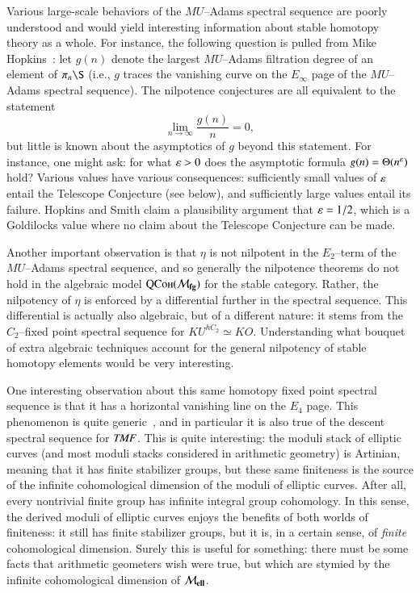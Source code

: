 Various large-scale behaviors of the $MU$--Adams spectral sequence are poorly understood and would yield interesting information about stable homotopy theory as a whole.  For instance, the following question is pulled from Mike Hopkins~\cite[Section 10]{HopkinsOnRavenel}: let $g(n)$ denote the largest $MU$--Adams filtration degree of an element of $\pi_n \S$ (i.e., $g$ traces the vanishing curve on the $E_\infty$ page of the $MU$--Adams spectral sequence).  The nilpotence conjectures are all equivalent to the statement \[\lim_{n \to \infty} \frac{g(n)}{n} = 0,\] but little is known about the asymptotics of $g$ beyond this statement.  For instance, one might ask: for what $\varepsilon > 0$ does the asymptotic formula $g(n) = \Theta(n^{\varepsilon})$ hold?  Various values have various consequences: sufficiently small values of $\varepsilon$ entail the Telescope Conjecture (see below), and sufficiently large values entail its failure.  Hopkins and Smith claim a plausibility argument that $\varepsilon = 1/2$, which is a Goldilocks value where no claim about the Telescope Conjecture can be made.

Another important observation is that $\eta$ is not nilpotent in the $E_2$--term of the $MU$--Adams spectral sequence, and so generally the nilpotence theorems do not hold in the algebraic model $\normalfont\textsc{QCoh}(\mathcal{M}_{\mathbf{fg}})$ for the stable category.  Rather, the nilpotency of $\eta$ is enforced by a differential further in the spectral sequence.  This differential is actually also algebraic, but of a different nature: it stems from the $C_2$--fixed point spectral sequence for $KU^{hC_2} \simeq KO$.  Understanding what bouquet of extra algebraic techniques account for the general nilpotency of stable homotopy elements would be very interesting.

One interesting observation about this same homotopy fixed point spectral sequence is that it has a horizontal vanishing line on the $E_4$ page.  This phenomenon is quite generic~\cite{MathewMeier}, and in particular it is also true of the descent spectral sequence for $\mathit{TMF}$.  This is quite interesting: the moduli stack of elliptic curves (and most moduli stacks considered in arithmetic geometry) is Artinian, meaning that it has finite stabilizer groups, but these same finiteness is the source of the infinite cohomological dimension of the moduli of elliptic curves.  After all, every nontrivial finite group has infinite integral group cohomology.  In this sense, the derived moduli of elliptic curves enjoys the benefits of both worlds of finiteness: it still has finite stabilizer groups, but it is, in a certain sense, of \emph{finite} cohomological dimension.  Surely this is useful for something: there must be some facts that arithmetic geometers wish were true, but which are stymied by the infinite cohomological dimension of $\mathcal{M}_{\mathbf{ell}}$.

